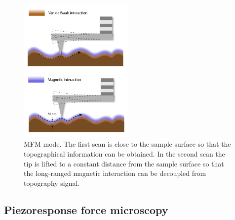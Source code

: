 \documentclass[pdflatex, sectionletters, 12pt, final, phd]{pittetd}    %
\begin{document}
\begin{figure}[h!]
	\centering
	\vspace{0.85cm}
	\includegraphics[width=0.5\textwidth]{Drawing/MFM.pdf}
	\caption[MFM mode]{MFM mode. The first scan is close to the sample surface so that the topographical information can be obtained. In the second scan the tip is lifted to a constant distance from the sample surface so that the long-ranged magnetic interaction can be decoupled from topography signal.}
	\label{FIG:MFM}
\end{figure}

\subsection{Piezoresponse force microscopy}
\end{document}
